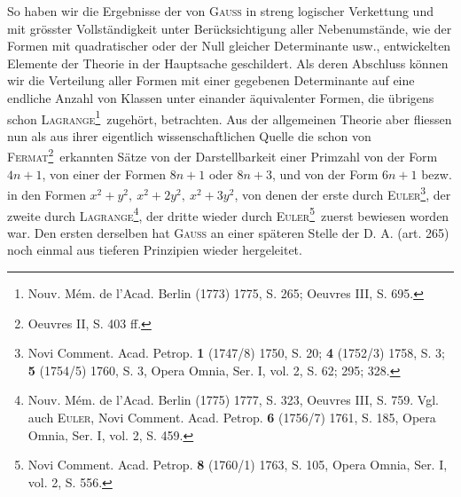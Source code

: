 So haben wir die Ergebnisse der von \textsc{Gauss} in streng logischer Verkettung und mit grösster Vollständigkeit unter Berücksichtigung aller Nebenumstände, wie der Formen mit quadratischer oder der Null gleicher Determinante usw., entwickelten Elemente der Theorie in der Hauptsache geschildert. Als deren Abschluss können wir die Verteilung aller Formen mit einer gegebenen Determinante auf eine endliche Anzahl von Klassen unter einander äquivalenter Formen, die übrigens schon \textsc{Lagrange}\footnote{Nouv. Mém. de l’Acad. Berlin (1773) 1775, S. 265; Oeuvres III, S. 695.}\ zugehört, betrachten. Aus der allgemeinen Theorie aber fliessen nun als aus ihrer eigentlich wissenschaftlichen Quelle die schon von \textsc{Fermat}\begingroup\renewcommand{\thefootnote}{**)}\footnote{Oeuvres II, S. 403 ff.}\endgroup\ erkannten Sätze von der Darstellbarkeit einer Primzahl von der Form \(4n+1\), von einer der Formen \(8n+1\) oder \(8n+3\), und von der Form \(6n+1\) bezw. in den Formen \(x^2+y^2,\ x^2+2y^2,\ x^2+3y^2\), von denen der erste durch \textsc{Euler}\begingroup\renewcommand{\thefootnote}{***)}\footnote{Novi Comment. Acad. Petrop. \textbf{1} (1747/8) 1750, S. 20; \textbf{4} (1752/3) 1758, S. 3; \textbf{5} (1754/5) 1760, S. 3, Opera Omnia, Ser. I, vol. 2, S. 62; 295; 328.}\endgroup, der zweite durch \textsc{Lagrange}\begingroup\renewcommand{\thefootnote}{\ensuremath{\dagger})}\footnote{Nouv. Mém. de l’Acad. Berlin (1775) 1777, S. 323, Oeuvres III, S. 759. Vgl. auch \textsc{Euler}, Novi Comment. Acad. Petrop. \textbf{6} (1756/7) 1761, S. 185, Opera Omnia, Ser. I, vol. 2, S. 459.}\endgroup, der dritte wieder durch \textsc{Euler}\begingroup\renewcommand{\thefootnote}{\ensuremath{\dagger\dagger})}\footnote{Novi Comment. Acad. Petrop. \textbf{8} (1760/1) 1763, S. 105, Opera Omnia, Ser. I, vol. 2, S. 556.}\endgroup\ zuerst bewiesen worden war. Den ersten derselben hat \textsc{Gauss} an einer späteren Stelle der D. A. (art. 265) noch einmal aus tieferen Prinzipien wieder hergeleitet.
